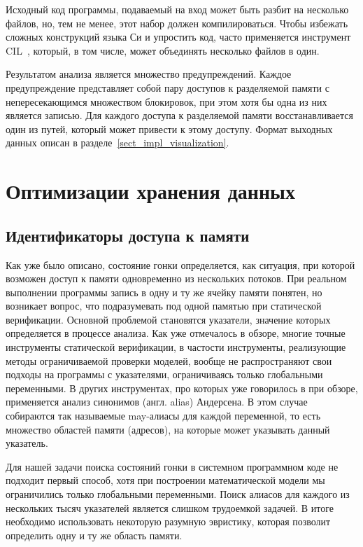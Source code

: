 Исходный код программы, подаваемый на вход может быть разбит на несколько файлов, но, тем не менее, этот набор должен компилироваться.
Чтобы избежать сложных конструкций языка Си и упростить код, часто применяется инструмент CIL~\cite{CIL}, который, в том числе, может объединять несколько файлов в один.

Результатом анализа является множество предупреждений.
Каждое предупреждение представляет собой пару доступов к разделяемой памяти с непересекающимся множеством блокировок, при этом хотя бы одна из них является записью.
Для каждого доступа к разделяемой памяти восстанавливается один из путей, который может привести к этому доступу.
Формат выходных данных описан в разделе~\ref{sect_impl_visualization}.

\section{Оптимизации хранения данных} \label{sect_impl_storage}

\subsection{Идентификаторы доступа к памяти} \label{subsect_impl_identifiers}

Как уже было описано, состояние гонки определяется, как ситуация, при которой возможен доступ к памяти одновременно из нескольких потоков. 
При реальном выполнении программы запись в одну и ту же ячейку памяти понятен, но возникает вопрос, что подразумевать под одной памятью при статической верификации.
Основной проблемой становятся указатели, значение которых определяется в процессе анализа.
Как уже отмечалось в обзоре, многие точные инструменты статической верификации, в частости инструменты, реализующие методы ограничиваемой проверки моделей, вообще не распространяют свои подходы на программы с указателями, ограничиваясь только глобальными переменными.
В других инструментах, про которых уже говорилось в при обзоре, применяется анализ синонимов (англ. alias) Андерсена.
В этом случае собираются так называемые may-алиасы для каждой переменной, то есть множество областей памяти (адресов), на которые может указывать данный указатель.

Для нашей задачи поиска состояний гонки в системном программном коде не подходит первый способ, хотя при построении математической модели мы ограничились только глобальными переменными.
Поиск алиасов для каждого из нескольких тысяч указателей является слишком трудоемкой задачей.
В итоге необходимо использовать некоторую разумную эвристику, которая позволит определить одну и ту же область памяти. 

